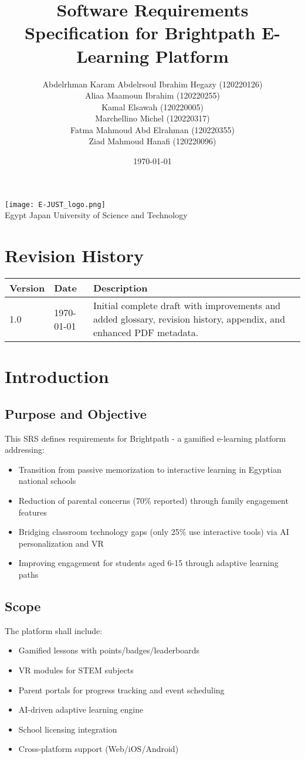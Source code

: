 \documentclass[12pt,a4paper]{article}
\title{Software Requirements Specification for Brightpath E-Learning Platform}
\author{
  Abdelrhman Karam Abdelrsoul Ibrahim Hegazy (120220126) \\
  Aliaa Maamoun Ibrahim (120220255) \\
  Kamal Elsawah (120220005) \\
  Marchellino Michel (120220317) \\
  Fatma Mahmoud Abd Elrahman (120220355) \\
  Ziad Mahmoud Hanafi (120220096)
}
\date{\today}
\newcommand{\universitylogo}{
  \begin{center}
    \texttt{[image: E-JUST\_logo.png]}\\[1em]
    {\Large Egypt Japan University of Science and Technology}\\[2em]
  \end{center}
}
\begin{document}
\maketitle
\universitylogo

\newpage
\tableofcontents
\newpage

\section*{Revision History}
\begin{longtable}{|p{3cm}|p{3cm}|p{8cm}|}
\hline
\textbf{Version} & \textbf{Date} & \textbf{Description} \\
\hline
1.0 & \today & Initial complete draft with improvements and added glossary, revision history, appendix, and enhanced PDF metadata. \\
\hline
\end{longtable}
\newpage


\section{Introduction}
\subsection{Purpose and Objective}
This SRS defines requirements for Brightpath - a gamified e-learning platform addressing:
\begin{itemize}[leftmargin=*]
  \item Transition from passive memorization to interactive learning in Egyptian national schools
  \item Reduction of parental concerns (70\% reported) through family engagement features
  \item Bridging classroom technology gaps (only 25\% use interactive tools) via AI personalization and VR
  \item Improving engagement for students aged 6-15 through adaptive learning paths
\end{itemize}

\subsection{Scope}
The platform shall include:
\begin{itemize}[leftmargin=*]
  \item Gamified lessons with points/badges/leaderboards
  \item VR modules for STEM subjects
  \item Parent portals for progress tracking and event scheduling
  \item AI-driven adaptive learning engine
  \item School licensing integration
  \item Cross-platform support (Web/iOS/Android)
\end{itemize}
\end{document}
